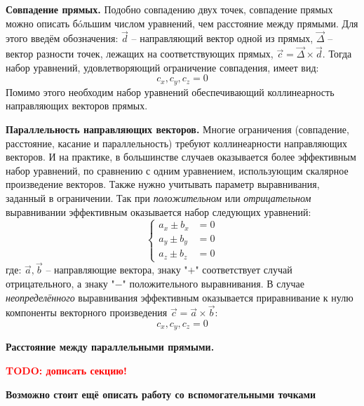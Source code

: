 
\textbf{Совпадение прямых.} Подобно совпадению двух точек, совпадение прямых можно описать б\'oльшим числом уравнений, чем расстояние между прямыми. Для этого введём обозначения: $\vec{d}$ -- направляющий вектор одной из прямых, $\vec{\Delta}$ -- вектор разности точек, лежащих на соответствующих прямых, $\vec{c} = \vec{\Delta}\times \vec{d} $. Тогда набор уравнений, удовлетворяющий ограничение совпадения, имеет вид:
\begin{equation*}
        c_x, c_y , c_z = 0
\end{equation*}
Помимо этого необходим набор уравнений обеспечивающий коллинеарность направляющих векторов прямых.

\textbf{Параллельность направляющих векторов.} Многие ограничения (совпадение, расстояние, касание и параллельность) требуют коллинеарности направляющих векторов. И на практике, в большинстве случаев оказывается более эффективным набор уравнений, по сравнению с одним уравнением, использующим скалярное произведение векторов. Также нужно учитывать параметр выравнивания, заданный в ограничении. Так при \textit{положительном} или \textit{отрицательном} выравнивании эффективным оказывается набор следующих уравнений:
\begin{equation*}
    \left\{\begin{matrix}
    a_x \pm b_x & = 0\\
    a_y \pm b_y & = 0\\
    a_z \pm b_z & = 0
    \end{matrix}\right.
\end{equation*}
где: $\vec{a}, \vec{b}$ -- направляющие вектора, знаку "$+$" соответствует случай отрицательного, а знаку "$-$" положительного выравнивания. В случае \textit{неопределённого} выравнивания эффективным оказывается приравнивание к нулю компоненты векторного произведения $\vec{c} = \vec{a} \times \vec{b}$:
\begin{equation*}
    c_x, c_y, c_z = 0
\end{equation*}

\textbf{Расстояние между параллельными прямыми.}

\textcolor{red}{\textbf{TODO: дописать секцию!}}

\textbf{Возможно стоит ещё описать работу со вспомогательными точками}